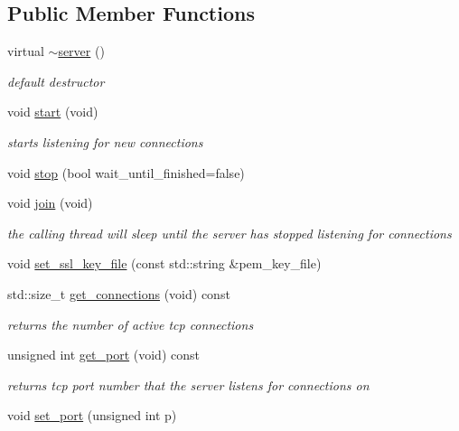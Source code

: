 \subsection*{Public Member Functions}
\begin{DoxyCompactItemize}
\item 
virtual \hyperlink{classpion_1_1tcp_1_1server_a728020c37ae9ec06197d01b195a24f9e}{$\sim$server} ()
\begin{DoxyCompactList}\small\item\em default destructor \end{DoxyCompactList}\item 
void \hyperlink{classpion_1_1tcp_1_1server_ad01034396caf2a31566c547d85478ea5}{start} (void)
\begin{DoxyCompactList}\small\item\em starts listening for new connections \end{DoxyCompactList}\item 
void \hyperlink{classpion_1_1tcp_1_1server_a855d4cd90004c47b924eab1fe0ffaa14}{stop} (bool wait\-\_\-until\-\_\-finished=false)
\item 
void \hyperlink{classpion_1_1tcp_1_1server_a50495c432f7a3441654b2d41a6f942a7}{join} (void)
\begin{DoxyCompactList}\small\item\em the calling thread will sleep until the server has stopped listening for connections \end{DoxyCompactList}\item 
void \hyperlink{classpion_1_1tcp_1_1server_a0d74cb19ac80dfc81cd92272f9f82905}{set\-\_\-ssl\-\_\-key\-\_\-file} (const std\-::string \&pem\-\_\-key\-\_\-file)
\item 
std\-::size\-\_\-t \hyperlink{classpion_1_1tcp_1_1server_aa56c4aebede625c3c70617552d0f08af}{get\-\_\-connections} (void) const 
\begin{DoxyCompactList}\small\item\em returns the number of active tcp connections \end{DoxyCompactList}\item 
unsigned int \hyperlink{classpion_1_1tcp_1_1server_a46c1027475b8748e2a3047c7b738ef0b}{get\-\_\-port} (void) const 
\begin{DoxyCompactList}\small\item\em returns tcp port number that the server listens for connections on \end{DoxyCompactList}\item 
void \hyperlink{classpion_1_1tcp_1_1server_a392e9ede66cf2f96af52655363951e96}{set\-\_\-port} (unsigned int p)

\end{DoxyCompactItemize}
